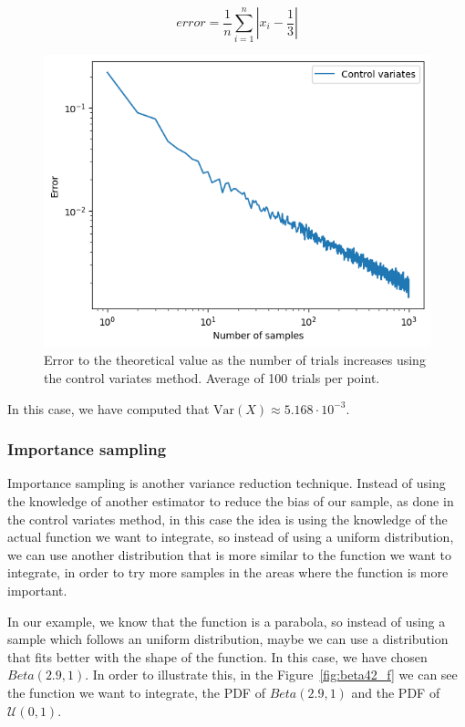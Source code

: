 \documentclass{article}
\begin{document}
\begin{equation*}
	error = \frac{1}{n}\sum_{i=1}^{n} | x_i - \frac{1}{3} |
\end{equation*}

\begin{figure}[H]
	\centering
	\includegraphics[width=0.5\linewidth]{./Figures/VarianceReduction/control.png}
	\caption{Error to the theoretical value as the number of trials increases using the control variates method. Average of 100 trials per point.}
	\label{fig:controlvariates}
\end{figure}

In this case, we have computed that \(\mathrm{Var}(X) \approx 5.168 \cdot 10^{-3}\).

\subsubsection{Importance sampling}
\label{sec:importance_sampling}

Importance sampling is another variance reduction technique. Instead of using the knowledge of another estimator to reduce the bias of our sample, as done in the control variates method, in this case the idea is using the knowledge of the actual function we want to integrate, so instead of using a uniform distribution, we can use another distribution that is more similar to the function we want to integrate, in order to try more samples in the areas where the function is more important. 

In our example, we know that the function is a parabola, so instead of using a sample which follows an uniform distribution, maybe we can use a distribution that fits better with the shape of the function. In this case, we have chosen \(Beta(2.9,1)\). In order to illustrate this, in the Figure~\ref{fig:beta42_f} we can see the function we want to integrate, the PDF of \(Beta(2.9,1)\) and the PDF of \(\mathcal{U}(0,1)\).
\end{document}
